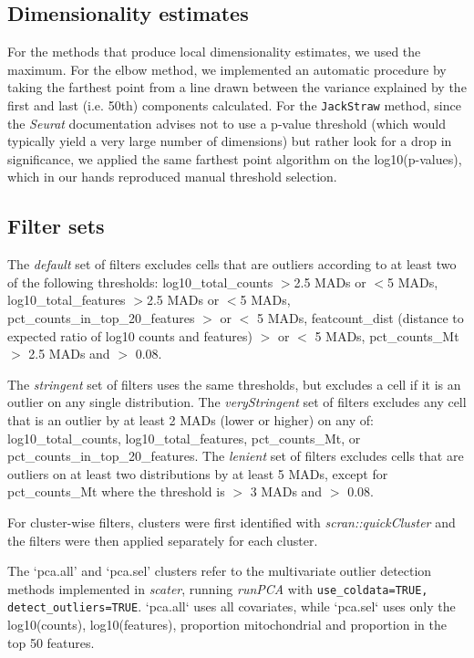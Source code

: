 \documentclass{bmcart}
\begin{document}
\subsection*{Dimensionality estimates}

For the methods that produce local dimensionality estimates, we used the maximum. For the elbow method, we implemented an automatic procedure by taking the farthest point from a line drawn between the variance explained by the first and last (i.e. 50th) components calculated. For the \texttt{JackStraw} method, since the \textit{Seurat} documentation advises not to use a p-value threshold (which would typically yield a very large number of dimensions) but rather look for a drop in significance, we applied the same farthest point algorithm on the log10(p-values), which in our hands reproduced manual threshold selection.

\subsection*{Filter sets}
The \textit{default} set of filters excludes cells that are outliers according to at least two of the following thresholds: log10\_total\_counts $>$2.5 MADs or $<$5 MADs, log10\_total\_features $>$2.5 MADs or $<$5 MADs, pct\_counts\_in\_top\_20\_features $>$ or $<$ 5 MADs, featcount\_dist (distance to expected ratio of log10 counts and features) $>$ or $<$ 5 MADs, pct\_counts\_Mt $>$ 2.5 MADs and $>$ 0.08.

The \textit{stringent} set of filters uses the same thresholds, but excludes a cell if it is an outlier on any single distribution. 
{\color{red}The \textit{veryStringent} set of filters excludes any cell that is an outlier by at least 2 MADs (lower or higher) on any of: log10\_total\_counts, log10\_total\_features, pct\_counts\_Mt, or pct\_counts\_in\_top\_20\_features.}
The \textit{lenient} set of filters excludes cells that are outliers on at least two distributions by at least 5 MADs, except for pct\_counts\_Mt where the threshold is $>$ 3 MADs and $>$ 0.08.

For cluster-wise filters, clusters were first identified with \textit{scran::quickCluster} and the filters were then applied separately for each cluster. 

The `pca.all' and `pca.sel' clusters refer to the multivariate outlier detection methods implemented in \textit{scater}, running \textit{runPCA} with \texttt{use\_coldata=TRUE, detect\_outliers=TRUE}. `pca.all` uses all covariates, while `pca.sel` uses only the log10(counts), log10(features), proportion mitochondrial and proportion in the top 50 features.
\end{document}
